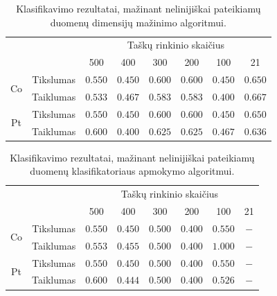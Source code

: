 \documentclass[]{vgtuef}
\begin{document}
\begin{table}
	\centering
	\caption{Klasifikavimo rezultatai, mažinant nelinijiškai pateikiamų duomenų dimensijų mažinimo algoritmui.}
	\label{table:second_phase_not_linear_experiment}
	\begin{tabular}{|c|c|c|c|c|c|c|c|} \hline
			& & \multicolumn{6}{c|}{Taškų rinkinio skaičius} \\ \cline{3-8}
						&	& 500 	& 400	& 300 	& 200 & 100 	& 21 	\\ \hline
		\multirow{2}{*}{Co}
		& Tikslumas & $0.550$ & $0.450$ & $0.600$ & $0.600$ & $0.450$ & $\mathbf{0.650}$ \\ \cline{2-8}
		& Taiklumas &	$0.533$ & $0.467$ & $0.583$ & $0.583$ & $0.400$ & $\mathbf{0.667}$ \\ \hline
		\multirow{2}{*}{Pt}
		& Tikslumas	& $0.550$ & $0.450$ & $0.600$ & $0.600$ & $0.450$ & $\mathbf{0.650}$ \\ \cline{2-8}
		& Taiklumas  &	$0.600$ & $0.400$ & $0.625$ & $0.625$ & $0.467$ & $\mathbf{0.636}$ \\ \hline
	\end{tabular}
\end{table}

\begin{table}
	\centering
	\caption{Klasifikavimo rezultatai, mažinant nelinijiškai pateikiamų duomenų klasifikatoriaus apmokymo algoritmui.}
	\label{table:second_phase_not_linear_experiment}
	\begin{tabular}{|c|c|c|c|c|c|c|c|} \hline
			& & \multicolumn{6}{c|}{Taškų rinkinio skaičius} \\ \cline{3-8}
						&	& 500 	& 400	& 300 	& 200 & 100 	& 21 	\\ \hline
		\multirow{2}{*}{Co}
		& Tikslumas	& $0.550$ & $0.450$ & $0.500$ & $0.400$ & $\mathbf{0.550}$ & $-$ \\ \cline{2-8}
		& Taiklumas  &	$0.553$ & $0.455$ & $0.500$ & $0.400$ & $\mathbf{1.000}$ & $-$ \\ \hline
		\multirow{2}{*}{Pt}
		& Tikslumas	& $0.550$ & $0.450$ & $0.500$ & $0.400$ & $\mathbf{0.550}$ & $-$ \\ \cline{2-8}
		& Taiklumas  &	$0.600$ & $0.444$ & $0.500$ & $0.400$ & $\mathbf{0.526}$ & $-$ \\ \hline
	\end{tabular}
\end{table}
\end{document}
